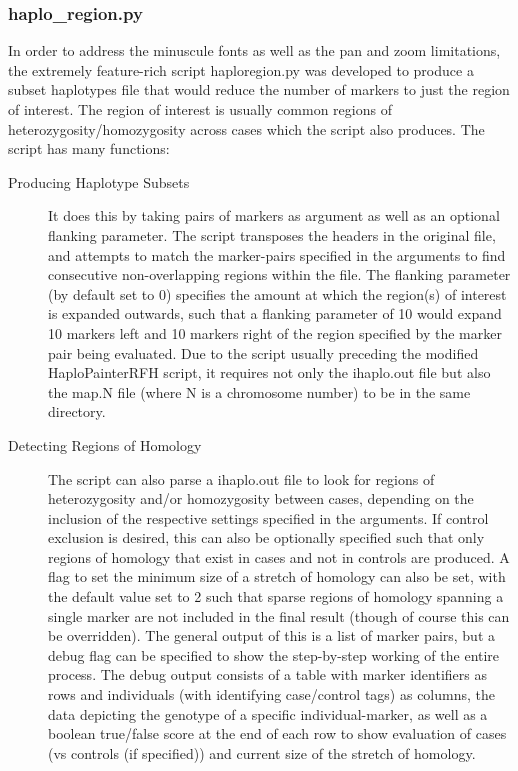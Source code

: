 \subsubsection{haplo\_region.py}

In order to address the minuscule fonts as well as the pan and zoom limitations, the extremely feature-rich script \gls{haploregion.py} was developed to produce a subset haplotypes file that would reduce the number of markers to just the region of interest. The region of interest is usually common regions of heterozygosity/homozygosity across cases which the script also produces. The script has many functions:

\begin{description}
\item[Producing Haplotype Subsets]{It does this by taking pairs of markers as argument as well as an optional flanking parameter. The script transposes the headers in the original file, and attempts to match the marker-pairs specified in the arguments to find consecutive non-overlapping regions within the file. The flanking parameter (by default set to 0) specifies the amount at which the region(s) of interest is expanded outwards, such that a flanking parameter of 10 would expand 10 markers left and 10 markers right of the region specified by the marker pair being evaluated. Due to the script usually preceding the modified HaploPainterRFH script, it requires not only the ihaplo.out file but also the map.N file (where N is a chromosome number) to be in the same directory.}

\item[Detecting Regions of Homology]{The script can also parse a ihaplo.out file to look for regions of heterozygosity and/or homozygosity between cases, depending on the inclusion of the respective settings specified in the arguments. If control exclusion is desired, this can also be optionally specified such that only regions of homology that exist in cases and not in controls are produced. A flag to set the minimum size of a stretch of homology can also be set, with the default value set to 2 such that sparse regions of homology spanning a single marker are not included in the final result (though of course this can be overridden). The general output of this is a list of marker pairs, but a debug flag can be specified to show the step-by-step working of the entire process. The debug output consists of a table with marker identifiers as rows and individuals (with identifying case/control tags) as columns, the data depicting the genotype of a specific individual-marker, as well as a boolean true/false score at the end of each row to show evaluation of cases (vs controls (if specified)) and current size of the stretch of homology.}


\end{description}
